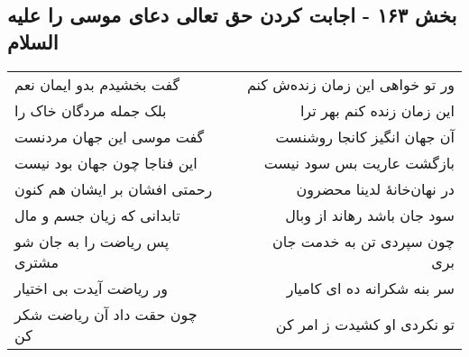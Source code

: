 \begin{center}
\section*{بخش ۱۶۳ - اجابت کردن حق تعالی دعای موسی را علیه السلام}
\label{sec:sh163}
\begin{longtable}{l p{0.5cm} r}
گفت بخشیدم بدو ایمان نعم
&&
ور تو خواهی این زمان زنده‌ش کنم
\\
بلک جمله مردگان خاک را
&&
این زمان زنده کنم بهر ترا
\\
گفت موسی این جهان مردنست
&&
آن جهان انگیز کانجا روشنست
\\
این فناجا چون جهان بود نیست
&&
بازگشت عاریت بس سود نیست
\\
رحمتی افشان بر ایشان هم کنون
&&
در نهان‌خانهٔ لدینا محضرون
\\
تابدانی که زیان جسم و مال
&&
سود جان باشد رهاند از وبال
\\
پس ریاضت را به جان شو مشتری
&&
چون سپردی تن به خدمت جان بری
\\
ور ریاضت آیدت بی اختیار
&&
سر بنه شکرانه ده ای کامیار
\\
چون حقت داد آن ریاضت شکر کن
&&
تو نکردی او کشیدت ز امر کن
\\
\end{longtable}
\end{center}
